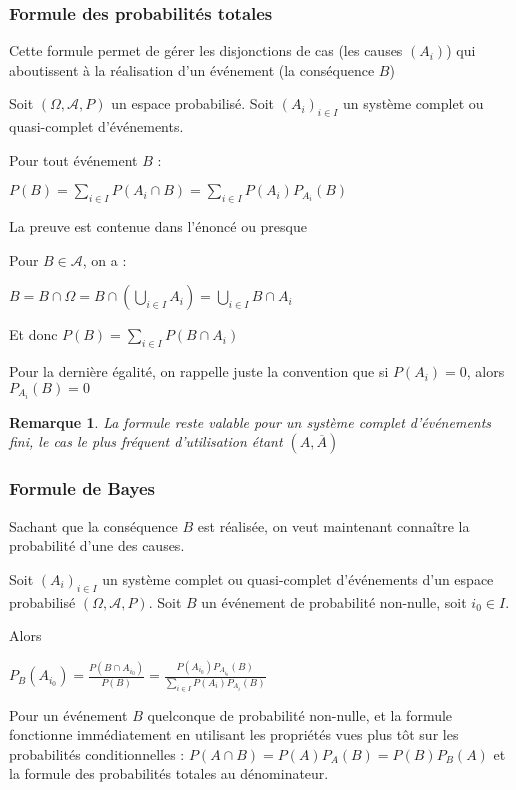 \documentclass[a4paper,12pt]{book}
\newcommand{\Thr}[2]{\begin{tcolorbox}[sharp corners, colback=white,colframe=red!90!black!75, title=Théorème : #1]#2\end{tcolorbox}}
\newcommand{\Pre}[1]{\begin{tcolorbox}[sharp corners, colback=white,colframe=green!60!green!30!black!75, title=Preuve]#1\end{tcolorbox}}
\newtheorem{Rem}{Remarque}[section]
\begin{document}
\subsubsection{Formule des probabilités totales} Cette formule permet de gérer les disjonctions de cas (les causes $(A_i)$) qui aboutissent à la réalisation d'un événement (la conséquence $B$)
\Thr{Formule des probabilités totales}{Soit $(\Omega, \mathcal{A}, P)$ un espace probabilisé. Soit $(A_i)_{i\in I}$ un système complet ou quasi-complet d'événements.
\par Pour tout événement $B$ :
\par\begin{center}$P(B)=\sum\limits_{i\in I}P(A_i\cap B)=\sum\limits_{i\in I}P(A_i)P_{A_i}(B)$\end{center}}
\Pre{La preuve est contenue dans l'énoncé ou presque
\par Pour $B\in\mathcal{A}$, on a :
\par $B=B\cap\Omega=B\cap\left(\bigcup_{i\in I}A_i\right)=\bigcup_{i\in I}B\cap A_i$
\par Et donc $P(B)=\sum\limits_{i\in I}P(B\cap A_i)$
\par Pour la dernière égalité, on rappelle juste la convention que si $P(A_i)=0$, alors $P_{A_i}(B)=0$}
\begin{Rem}
La formule reste valable pour un système complet d'événements fini, le cas le plus fréquent d'utilisation étant $(A, \overline{A})$
\end{Rem}

\subsubsection{Formule de Bayes} Sachant que la conséquence $B$ est réalisée, on veut maintenant connaître la probabilité d'une des causes.
\Thr{Formule d'inversion de Bayes}{Soit $(A_i)_{i\in I}$ un système complet ou quasi-complet d'événements d'un espace probabilisé $(\Omega, \mathcal{A},P)$. Soit $B$ un événement de probabilité non-nulle, soit $i_0\in I$.
\par Alors \par\begin{center}$P_B(A_{i_0})=\frac{P(B\cap A_{i_0})}{P(B)}=\frac{P(A_{i_0})P_{A_{i_0}}(B)}{\sum\limits_{i\in I}P(A_i)P_{A_i}(B)}$\end{center}}
\Pre{Pour un événement $B$ quelconque de probabilité non-nulle, et la formule fonctionne immédiatement en utilisant les propriétés vues plus tôt sur les probabilités conditionnelles : $P(A\cap B)=P(A)P_A(B)=P(B)P_B(A)$ et la formule des probabilités totales au dénominateur.}
\end{document}
